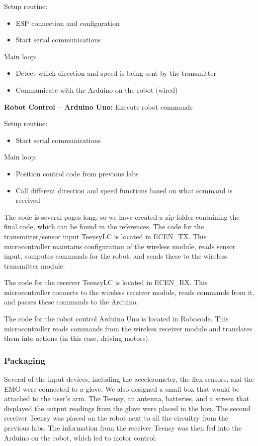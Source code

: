 \documentclass[12pt,scrartcl,titlepage]{article}
\begin{document}
 {
  Setup routine:
  \begin{itemize}
  \item ESP connection and configuration
  \item Start serial communications
  \end{itemize}
  Main loop:
  \begin{itemize}
  \item Detect which direction and speed is being sent by the transmitter
  \item Communicate with the Arduino on the robot (wired)
  \end{itemize}
}

\textbf{Robot Control – Arduino Uno:} Execute robot commands

{
  Setup routine:
  \begin{itemize}
  \item Start serial communications
  \end{itemize}
  Main loop:
  \begin{itemize}
  \item Position control code from previous labs
  \item Call different direction and speed functions based on what command is received
  \end{itemize}
}

The code is several pages long, so we have created a zip folder containing the final code, which can be found in the references. The code for the transmitter/sensor input TeensyLC is located in ECEN\_TX. This microcontroller maintains configuration of the wireless module, reads sensor input, computes commands for the robot, and sends these to the wireless transmitter module.

The code for the receiver TeensyLC is located in ECEN\_RX. This microcontroller connects to the wireless receiver module, reads commands from it, and passes these commands to the Arduino.

The code for the robot control Arduino Uno is located in Robocode. This microcontroller reads commands from the wireless receiver module and translates them into actions (in this case, driving motors).
  
  \subsubsection{Packaging}

  Several of the input devices, including the accelerometer, the flex sensors, and the EMG were connected to a glove. We also designed a small box that would be attached to the user’s arm. The Teensy, an antenna, batteries, and a screen that displayed the output readings from the glove were placed in the box. The second receiver Teensy was placed on the robot next to all the circuitry from the previous labs. The information from the receiver Teensy was then fed into the Arduino on the robot, which led to motor control.
  
\end{document}
